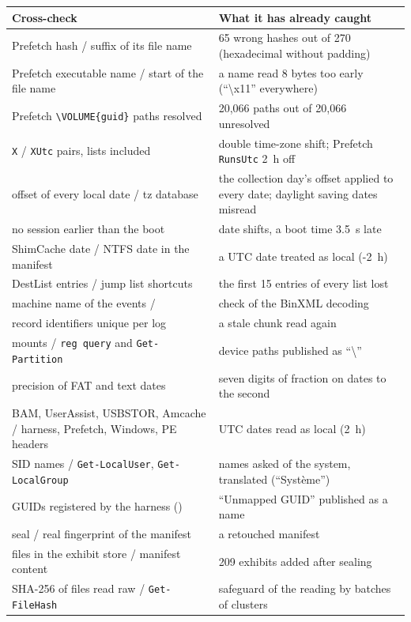\documentclass[11pt,a4paper,oneside]{report}
\begin{document}
\begin{longtable}{@{}L{6.6cm}L{8.4cm}@{}}
\toprule
\textbf{Cross-check} & \textbf{What it has already caught} \\
\midrule
\endhead
Prefetch hash / suffix of its file name & 65 wrong hashes out of 270 (hexadecimal without padding) \\
Prefetch executable name / start of the file name & a name read 8 bytes too early (``\textbackslash x11'' everywhere) \\
Prefetch \texttt{\textbackslash VOLUME\{guid\}} paths resolved & 20,066 paths out of 20,066 unresolved \\
\texttt{X} / \texttt{XUtc} pairs, lists included & double time-zone shift; Prefetch \texttt{RunsUtc} 2~h off \\
offset of every local date / tz database & the collection day's offset applied to every date; daylight saving dates misread \\
no session earlier than the boot & date shifts, a boot time 3.5~s late \\
ShimCache date / NTFS date in the manifest & a UTC date treated as local (-2~h) \\
DestList entries / jump list shortcuts & the first 15 entries of every list lost \\
machine name of the events /  & check of the BinXML decoding \\
record identifiers unique per log & a stale chunk read again \\
mounts / \texttt{reg query} and \texttt{Get-Partition} & device paths published as ``\textbackslash{}'' \\
precision of FAT and text dates & seven digits of fraction on dates to the second \\
BAM, UserAssist, USBSTOR, Amcache / harness, Prefetch, Windows, PE headers & UTC dates read as local (2~h) \\
SID names / \texttt{Get-LocalUser}, \texttt{Get-LocalGroup} & names asked of the system, translated (``Système'') \\
GUIDs registered by the harness () & ``Unmapped GUID'' published as a name \\
seal / real fingerprint of the manifest & a retouched manifest \\
files in the exhibit store / manifest content & 209 exhibits added after sealing \\
SHA-256 of files read raw / \texttt{Get-FileHash} & safeguard of the reading by batches of clusters \\

\end{longtable}
\end{document}
